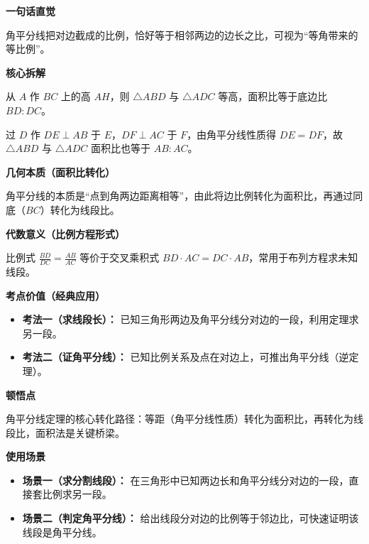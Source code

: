\begin{explanationbox}
	\textbf{\textcolor{CExplanation}{一句话直觉}}

	角平分线把对边截成的比例，恰好等于相邻两边的边长之比，可视为“等角带来的等比例”。

	\medskip
	\textbf{\textcolor{CExplanation}{核心拆解}}
	\begin{description}[style=nextline, leftmargin=2.8em, labelsep=0.5em, itemsep=0.45em]
		\item[\textbf{要点一（面积拆分）：}] 从 $A$ 作 $BC$ 上的高 $AH$，则 $\triangle ABD$ 与 $\triangle ADC$ 等高，面积比等于底边比 $BD:DC$。
		\item[\textbf{要点二（等距转化）：}] 过 $D$ 作 $DE\perp AB$ 于 $E$，$DF\perp AC$ 于 $F$，由角平分线性质得 $DE=DF$，故 $\triangle ABD$ 与 $\triangle ADC$ 面积比也等于 $AB:AC$。
	\end{description}

	\medskip
	\textbf{\textcolor{CExplanation}{几何本质（面积比转化）}}

	角平分线的本质是“点到角两边距离相等”，由此将边比例转化为面积比，再通过同底（$BC$）转化为线段比。

	\medskip
	\textbf{\textcolor{CExplanation}{代数意义（比例方程形式）}}

	比例式 $\frac{BD}{DC}=\frac{AB}{AC}$ 等价于交叉乘积式 $BD\cdot AC = DC\cdot AB$，常用于布列方程求未知线段。

	\medskip
	\textbf{\textcolor{CExplanation}{考点价值（经典应用）}}
	\begin{itemize}[leftmargin=*, itemsep=0.5em, topsep=0.4em]
		\item \textbf{考法一（求线段长）：} 已知三角形两边及角平分线分对边的一段，利用定理求另一段。
		\item \textbf{考法二（证角平分线）：} 已知比例关系及点在对边上，可推出角平分线（逆定理）。
	\end{itemize}

	\medskip
	\textbf{\textcolor{CExplanation}{顿悟点}}

	角平分线定理的核心转化路径：等距（角平分线性质）转化为面积比，再转化为线段比，面积法是关键桥梁。

	\medskip
	\textbf{\textcolor{CExplanation}{使用场景}}
	\begin{itemize}[leftmargin=*, itemsep=0.5em, topsep=0.4em]
		\item \textbf{场景一（求分割线段）：} 在三角形中已知两边长和角平分线分对边的一段，直接套比例求另一段。
		\item \textbf{场景二（判定角平分线）：} 给出线段分对边的比例等于邻边比，可快速证明该线段是角平分线。
	\end{itemize}
\end{explanationbox}
